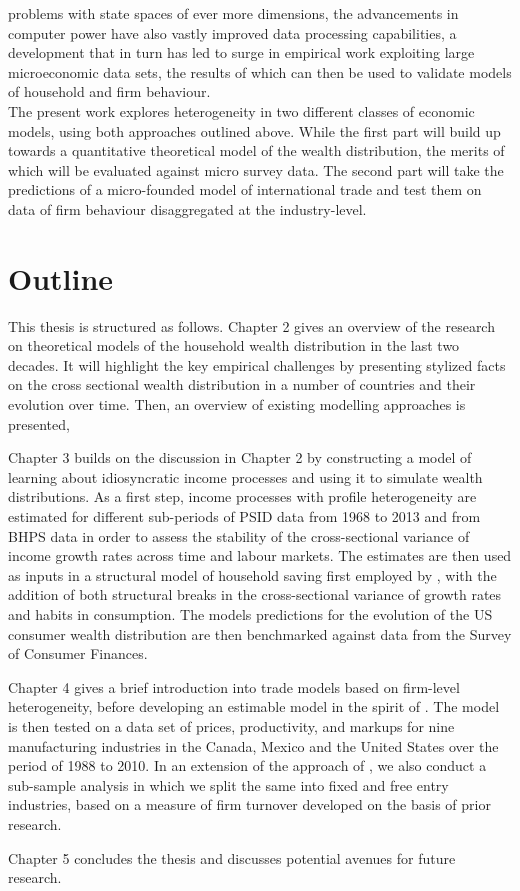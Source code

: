 problems with state spaces of ever more dimensions, the advancements in computer
power have also vastly improved data processing capabilities, a development that
in turn has led to surge in empirical work exploiting large microeconomic data
sets, the results of which can then be used to validate models of household
and firm behaviour. \\
The present work explores heterogeneity in two different classes of economic models,
using both approaches outlined above. While the first part will build up towards
a quantitative theoretical model of the wealth distribution, the merits of which
will be evaluated against micro survey data. The second part will take the predictions
of a micro-founded model of international trade and test them on data of firm 
behaviour disaggregated at the industry-level. 

\section{Outline}
This thesis is structured as follows. Chapter 2 gives an overview of the research 
on theoretical models of the household wealth distribution in the last two decades. 
It will highlight the key empirical challenges by presenting stylized facts on 
the cross sectional wealth distribution in a number of countries and their 
evolution over time. Then, an overview of existing modelling approaches is presented,  

Chapter 3 builds on the discussion in Chapter 2 by constructing a model of 
learning about idiosyncratic income processes and using it to simulate wealth 
distributions. As a first step, income processes with profile heterogeneity are 
estimated for different sub-periods of PSID data from 1968 to 2013 and from BHPS 
data in order to assess the stability of the cross-sectional variance of income 
growth rates across time and labour markets. The estimates are then used as inputs 
in a structural model of household saving first employed by \citet{Guvenen2007}, 
with the addition of both structural breaks in the cross-sectional variance of 
growth rates and habits in consumption. The models predictions for the evolution
of the US consumer wealth distribution are then benchmarked against data from the 
Survey of Consumer Finances. 

Chapter 4 gives a brief introduction into trade models based on firm-level 
heterogeneity, before developing an estimable model in the spirit of \citet{Chen2009}. 
The model is then tested on a data set of prices, productivity, and markups for 
nine manufacturing industries in the Canada, Mexico and the United States over 
the period of 1988 to 2010. In an extension of the approach of \citet{Chen2009},
 we also conduct a sub-sample analysis in which we split the same into fixed and 
free entry industries, based on a measure of firm turnover developed on the basis 
of prior research. 

Chapter 5 concludes the thesis and discusses potential avenues for future research.